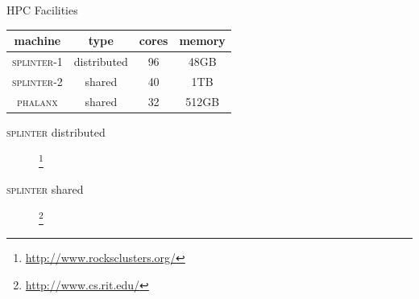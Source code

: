 \documentclass{beamer}
\begin{document}
\begin{frame}{HPC Facilities}
  \begin{table}
    \begin{tabular}{|c|c|c|c|}
      \hline
      machine & type & cores & memory  \\
      \hline
      \textsc{splinter}-1 & distributed & 96 & 48GB  \\
      \textsc{splinter}-2 & shared & 40 & 1TB \\
      \textsc{phalanx} & shared & 32 & 512GB \\
      \hline
    \end{tabular}
  \end{table}
\end{frame}

\begin{frame}{\textsc{splinter} distributed}
  \begin{figure}
    \begin{center}
      \footnote{\url{http://www.rocksclusters.org/}}
    \end{center}
  \end{figure}
\end{frame}

\begin{frame}{\textsc{splinter} shared}
  \begin{figure}
    \begin{center}
      \footnote{\url{http://www.cs.rit.edu/}}
    \end{center}
  \end{figure}
\end{frame}
\end{document}
